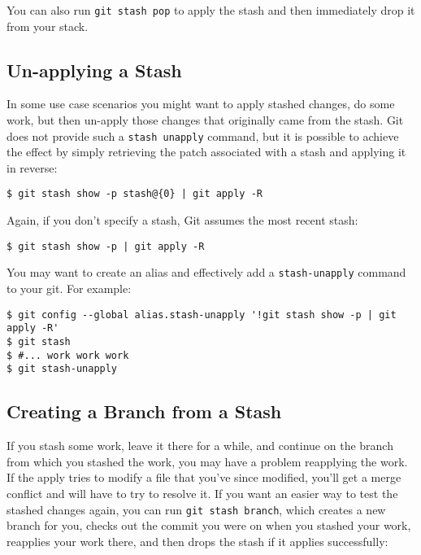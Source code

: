 \documentclass[a4paper]{book}
\begin{document}
You can also run \texttt{git stash pop} to apply the stash and then immediately drop it from your stack.

\subsection{Un-applying a Stash}\label{un-applying-a-stash}

In some use case scenarios you might want to apply stashed changes, do some work, but then un-apply those changes that originally came from the stash. Git does not provide such a \texttt{stash unapply} command, but it is possible to achieve the effect by simply retrieving the patch associated with a stash and applying it in reverse:

\begin{shaded}\begin{verbatim}
$ git stash show -p stash@{0} | git apply -R
\end{verbatim}\end{shaded}

Again, if you don't specify a stash, Git assumes the most recent stash:

\begin{shaded}\begin{verbatim}
$ git stash show -p | git apply -R
\end{verbatim}\end{shaded}

You may want to create an alias and effectively add a \texttt{stash-unapply} command to your git. For example:

\begin{shaded}\begin{verbatim}
$ git config --global alias.stash-unapply '!git stash show -p | git apply -R'
$ git stash
$ #... work work work
$ git stash-unapply
\end{verbatim}\end{shaded}

\subsection{Creating a Branch from a Stash}\label{creating-a-branch-from-a-stash}

If you stash some work, leave it there for a while, and continue on the branch from which you stashed the work, you may have a problem reapplying the work. If the apply tries to modify a file that you've since modified, you'll get a merge conflict and will have to try to resolve it. If you want an easier way to test the stashed changes again, you can run \texttt{git stash branch}, which creates a new branch for you, checks out the commit you were on when you stashed your work, reapplies your work there, and then drops the stash if it applies successfully:
\end{document}
